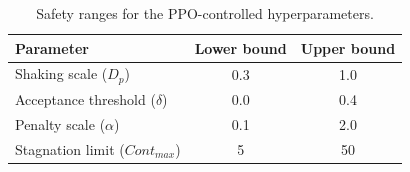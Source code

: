 \begin{table}[ht]
\centering
\caption{Safety ranges for the PPO-controlled hyperparameters.}
\label{tab:ppo_ranges}
\begin{tabular}{lcc}
\hline
Parameter & Lower bound & Upper bound \\
\hline
Shaking scale ($D_p$) & 0.3 & 1.0 \\
Acceptance threshold ($\delta$) & 0.0 & 0.4 \\
Penalty scale ($\alpha$) & 0.1 & 2.0 \\
Stagnation limit ($Cont_{max}$) & 5 & 50 \\
\hline
\end{tabular}
\end{table}